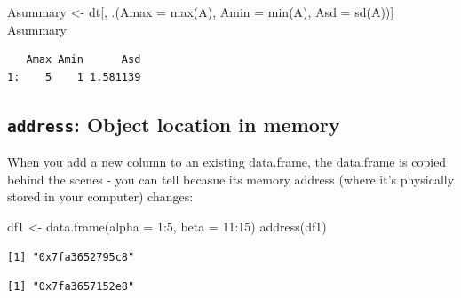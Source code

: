 \documentclass[
]{book}
\newenvironment{Shaded}{\begin{snugshade}}{\end{snugshade}}
\newcommand{\AttributeTok}[1]{\textcolor[rgb]{0.77,0.63,0.00}{#1}}
\newcommand{\DecValTok}[1]{\textcolor[rgb]{0.00,0.00,0.81}{#1}}
\newcommand{\FunctionTok}[1]{\textcolor[rgb]{0.00,0.00,0.00}{#1}}
\newcommand{\NormalTok}[1]{#1}
\newcommand{\OtherTok}[1]{\textcolor[rgb]{0.56,0.35,0.01}{#1}}
\newcommand{\SpecialCharTok}[1]{\textcolor[rgb]{0.00,0.00,0.00}{#1}}
\begin{document}
\begin{Shaded}
\begin{Highlighting}[]
\NormalTok{Asummary }\OtherTok{\textless{}{-}}\NormalTok{ dt[, .(}\AttributeTok{Amax =} \FunctionTok{max}\NormalTok{(A), }\AttributeTok{Amin =} \FunctionTok{min}\NormalTok{(A), }\AttributeTok{Asd =} \FunctionTok{sd}\NormalTok{(A))]}
\NormalTok{Asummary}
\end{Highlighting}
\end{Shaded}

\begin{verbatim}
   Amax Amin      Asd
1:    5    1 1.581139
\end{verbatim}

\hypertarget{address-object-location-in-memory}{%
\subsection{\texorpdfstring{\texttt{address}: Object location in memory}{address: Object location in memory}}\label{address-object-location-in-memory}}

When you add a new column to an existing data.frame, the data.frame is copied behind the scenes - you can tell becasue its memory address (where it's physically stored in your computer) changes:

\begin{Shaded}
\begin{Highlighting}[]
\NormalTok{df1 }\OtherTok{\textless{}{-}} \FunctionTok{data.frame}\NormalTok{(}\AttributeTok{alpha =} \DecValTok{1}\SpecialCharTok{:}\DecValTok{5}\NormalTok{, }\AttributeTok{beta =} \DecValTok{11}\SpecialCharTok{:}\DecValTok{15}\NormalTok{)}
\FunctionTok{address}\NormalTok{(df1)}
\end{Highlighting}
\end{Shaded}

\begin{verbatim}
[1] "0x7fa3652795c8"
\end{verbatim}

\begin{Shaded}
\end{Shaded}

\begin{verbatim}
[1] "0x7fa3657152e8"
\end{verbatim}
\end{document}
